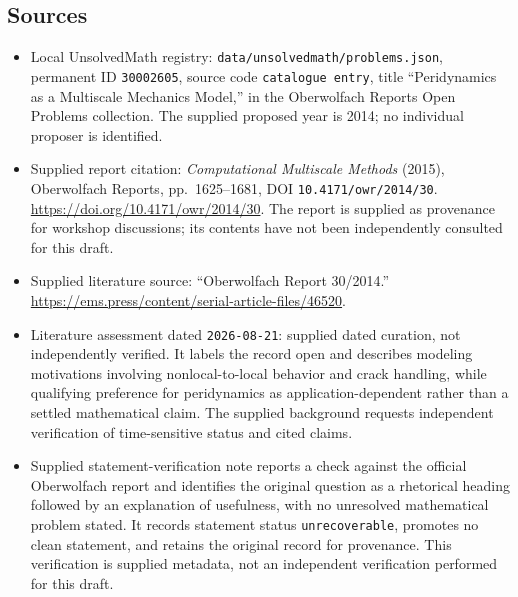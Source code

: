 \documentclass[11pt]{article}
\begin{document}
\subsection{Sources}
\begin{itemize}
\item Local UnsolvedMath registry: \texttt{data/unsolvedmath/problems.json}, permanent ID \texttt{30002605}, source code \texttt{catalogue entry}, title ``Peridynamics as a Multiscale Mechanics Model,'' in the Oberwolfach Reports Open Problems collection. The supplied proposed year is 2014; no individual proposer is identified.
\item Supplied report citation: \emph{Computational Multiscale Methods} (2015), Oberwolfach Reports, pp.\ 1625--1681, DOI \texttt{10.4171/owr/2014/30}. \url{https://doi.org/10.4171/owr/2014/30}. The report is supplied as provenance for workshop discussions; its contents have not been independently consulted for this draft.
\item Supplied literature source: ``Oberwolfach Report 30/2014.'' \url{https://ems.press/content/serial-article-files/46520}.
\item Literature assessment dated \texttt{2026-08-21}: supplied dated curation, not independently verified. It labels the record open and describes modeling motivations involving nonlocal-to-local behavior and crack handling, while qualifying preference for peridynamics as application-dependent rather than a settled mathematical claim. The supplied background requests independent verification of time-sensitive status and cited claims.
\item Supplied statement-verification note reports a check against the official Oberwolfach report and identifies the original question as a rhetorical heading followed by an explanation of usefulness, with no unresolved mathematical problem stated. It records statement status \texttt{unrecoverable}, promotes no clean statement, and retains the original record for provenance. This verification is supplied metadata, not an independent verification performed for this draft.
\end{itemize}
\end{document}
